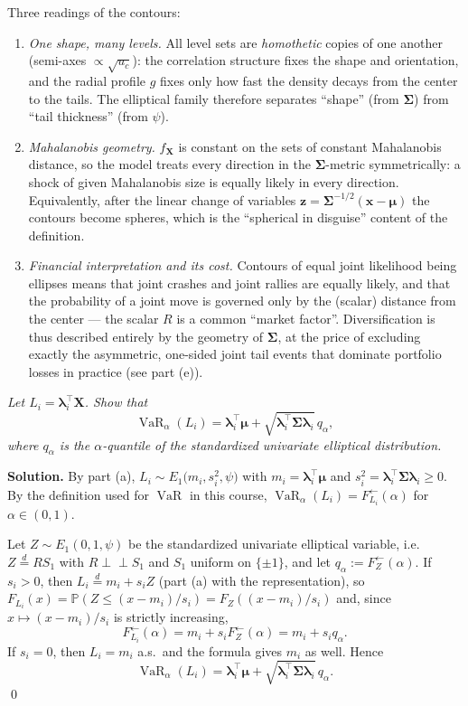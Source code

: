 \documentclass{MFM-hw} %
\newcommand{\VaR}{\operatorname{VaR}}
\renewcommand{\P}{\mathbb{P}}
\newcommand{\inde}{\perp\!\!\!\perp}
\newcommand{\bX}{\bm{X}}
\newcommand{\bx}{\bm{x}}
\newcommand{\bz}{\bm{z}}
\newcommand{\blambda}{\bm{\lambda}}
\newcommand{\bmu}{\bm{\mu}}
\newcommand{\bSigma}{\bm{\Sigma}}
\begin{document}
Three readings of the contours:
\begin{enumerate}
    \item \emph{One shape, many levels.} All level sets are \emph{homothetic} copies of one another (semi-axes $\propto\sqrt{u_c}$): the correlation structure fixes the shape and orientation, and the radial profile $g$ fixes only how fast the density decays from the center to the tails. The elliptical family therefore separates ``shape'' (from $\bSigma$) from ``tail thickness'' (from $\psi$).
    \item \emph{Mahalanobis geometry.} $f_{\bX}$ is constant on the sets of constant Mahalanobis distance, so the model treats every direction in the $\bSigma$-metric symmetrically: a shock of given Mahalanobis size is equally likely in every direction. Equivalently, after the linear change of variables $\bz=\bSigma^{-1/2}(\bx-\bmu)$ the contours become spheres, which is the ``spherical in disguise'' content of the definition.
    \item \emph{Financial interpretation and its cost.} Contours of equal joint likelihood being ellipses means that joint crashes and joint rallies are equally likely, and that the probability of a joint move is governed only by the (scalar) distance from the center --- the scalar $R$ is a common ``market factor''. Diversification is thus described entirely by the geometry of $\bSigma$, at the price of excluding exactly the asymmetric, one-sided joint tail events that dominate portfolio losses in practice (see part (e)).
\end{enumerate}

\HWsubproblem
\noindent\textit{Let $L_i=\blambda_i^\top\bX$. Show that}
\[
    \VaR_\alpha(L_i)=\blambda_i^\top\bmu+\sqrt{\blambda_i^\top\bSigma\blambda_i}\,q_\alpha ,
\]
\textit{where $q_\alpha$ is the $\alpha$-quantile of the standardized univariate elliptical distribution.}

\medskip
\textbf{Solution.} By part (a), $L_i\sim E_1\bigl(m_i,s_i^2,\psi\bigr)$ with $m_i=\blambda_i^\top\bmu$ and $s_i^2=\blambda_i^\top\bSigma\blambda_i\ge0$. By the definition used for $\VaR$ in this course, $\VaR_\alpha(L_i)=F_{L_i}^{\leftarrow}(\alpha)$ for $\alpha\in(0,1)$.

Let $Z\sim E_1(0,1,\psi)$ be the standardized univariate elliptical variable, i.e.\ $Z\overset{d}{=}RS_1$ with $R\inde S_1$ and $S_1$ uniform on $\{\pm1\}$, and let $q_\alpha:=F_Z^{\leftarrow}(\alpha)$. If $s_i>0$, then $L_i\overset{d}{=}m_i+s_iZ$ (part (a) with the representation), so $F_{L_i}(x)=\P(Z\le (x-m_i)/s_i)=F_Z((x-m_i)/s_i)$ and, since $x\mapsto(x-m_i)/s_i$ is strictly increasing,
\[
    F_{L_i}^{\leftarrow}(\alpha)=m_i+s_iF_Z^{\leftarrow}(\alpha)=m_i+s_iq_\alpha .
\]
If $s_i=0$, then $L_i=m_i$ a.s.\ and the formula gives $m_i$ as well. Hence
\[
    \boxed{\;\VaR_\alpha(L_i)=\blambda_i^\top\bmu+\sqrt{\blambda_i^\top\bSigma\blambda_i}\,q_\alpha .\;}
\]
\qed
\end{document}
